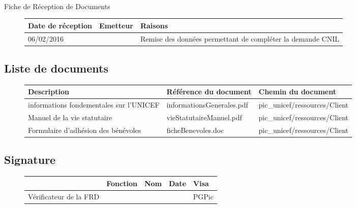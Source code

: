 \documentclass[asi, sansVersion]{picInsa}
\begin{document}
\begin{center}
\huge
\nomEquipe{}\\
Fiche de Réception de Documents\\
\end{center}
\vspace{0.5cm}


\begin{figure}[H]
		\centering
		\begin{tabularx}{17cm}{|X|X|X|}
		\hline
		\rowcolor[gray]{0.85}Date de réception & Emetteur & Raisons \\
		\hline
		06/02/2016 & \nomClient{} & Remise des données permettant de compléter la demande CNIL\\
		\hline
		\end{tabularx}
\end{figure}

\subsection*{Liste de documents}

\begin{figure}[H]
		\centering
		\begin{tabularx}{17cm}{|X|X|X|}
		\hline
		\rowcolor[gray]{0.85} Description & Référence du document & Chemin du document \\
		\hline		
		informations fondementales sur l'UNICEF & informationsGenerales.pdf & pic\_unicef/ressources/Client \\
		\hline
		Manuel de la vie statutaire & vieStatutaireManuel.pdf & pic\_unicef/ressources/Client\\
		\hline
		Formulaire d'adhésion des bénévoles & ficheBenevoles.doc & pic\_unicef/ressources/Client\\
		\hline
		\end{tabularx}
\end{figure}

\subsection*{Signature}

\begin{figure}[H]
		\centering
		\begin{tabularx}{17cm}{|p{4cm}|X|X|X|X|}
		\hline
		\rowcolor[gray]{0.85}& Fonction & Nom & Date & Visa \\
		\hline
		 Vérificateur de la FRD & \RGC & \Mathieu &  & PGPic \\
		\hline
		\end{tabularx}
\end{figure}
\end{document}
